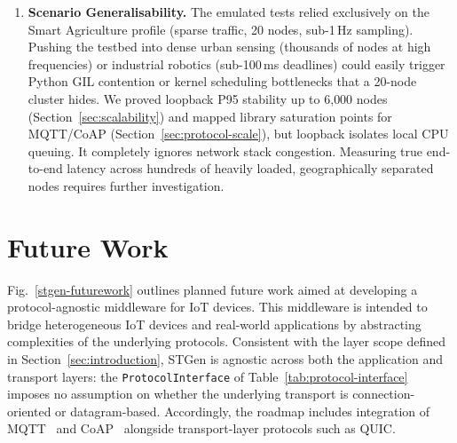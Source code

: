 \documentclass[jsan,article,submit,moreauthors,pdftex]{Definitions/mdpi}
\begin{document}
\begin{enumerate}
\item \textbf{Scenario Generalisability.}
The emulated tests relied exclusively on the Smart Agriculture profile (sparse traffic, 20 nodes, sub-1\,Hz sampling). Pushing the testbed into dense urban sensing (thousands of nodes at high frequencies) or industrial robotics (sub-100\,ms deadlines) could easily trigger Python GIL contention or kernel scheduling bottlenecks that a 20-node cluster hides. We proved loopback P95 stability up to 6{,}000 nodes (Section~\ref{sec:scalability}) and mapped library saturation points for MQTT/CoAP (Section~\ref{sec:protocol-scale}), but loopback isolates local CPU queuing. It completely ignores network stack congestion. Measuring true end-to-end latency across hundreds of heavily loaded, geographically separated nodes requires further investigation.

\end{enumerate}
\section{Future Work}
\label{sec:future-work}
Fig.~\ref{stgen-futurework} outlines planned future work aimed at developing a protocol-agnostic middleware for {IoT} devices. This middleware is intended to bridge heterogeneous {IoT} devices and real-world applications by abstracting complexities of the underlying protocols. Consistent with the layer scope defined in Section~\ref{sec:introduction}, STGen is agnostic across both the application and transport layers: the \texttt{ProtocolInterface} of Table~\ref{tab:protocol-interface} imposes no assumption on whether the underlying transport is connection-oriented or datagram-based. Accordingly, the roadmap includes integration of MQTT~\cite{quincozes2019mqtt} and CoAP~\cite{6159216} alongside transport-layer protocols such as QUIC.
\end{document}
